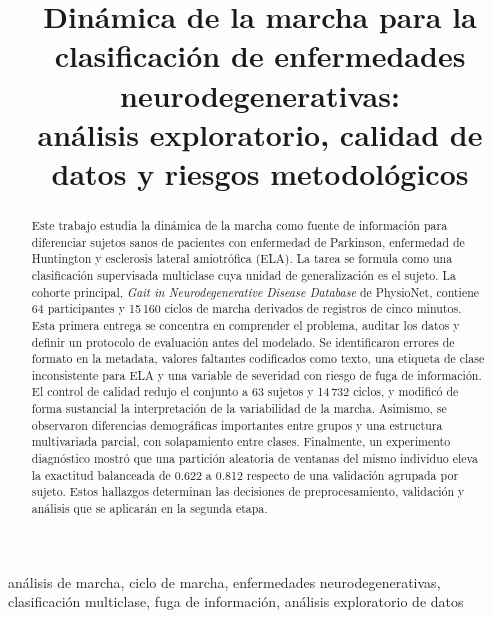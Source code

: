 \documentclass[conference]{IEEEtran}
\begin{document}
\title{Dinámica de la marcha para la clasificación de enfermedades neurodegenerativas:\\análisis exploratorio, calidad de datos y riesgos metodológicos}

\author{
}

\maketitle

\begin{abstract}
Este trabajo estudia la dinámica de la marcha como fuente de información para diferenciar sujetos sanos de pacientes con enfermedad de Parkinson, enfermedad de Huntington y esclerosis lateral amiotrófica (ELA). La tarea se formula como una clasificación supervisada multiclase cuya unidad de generalización es el sujeto. La cohorte principal, \textit{Gait in Neurodegenerative Disease Database} de PhysioNet, contiene 64 participantes y 15\,160 ciclos de marcha derivados de registros de cinco minutos. Esta primera entrega se concentra en comprender el problema, auditar los datos y definir un protocolo de evaluación antes del modelado. Se identificaron errores de formato en la metadata, valores faltantes codificados como texto, una etiqueta de clase inconsistente para ELA y una variable de severidad con riesgo de fuga de información. El control de calidad redujo el conjunto a 63 sujetos y 14\,732 ciclos, y modificó de forma sustancial la interpretación de la variabilidad de la marcha. Asimismo, se observaron diferencias demográficas importantes entre grupos y una estructura multivariada parcial, con solapamiento entre clases. Finalmente, un experimento diagnóstico mostró que una partición aleatoria de ventanas del mismo individuo eleva la exactitud balanceada de 0.622 a 0.812 respecto de una validación agrupada por sujeto. Estos hallazgos determinan las decisiones de preprocesamiento, validación y análisis que se aplicarán en la segunda etapa.
\end{abstract}

\begin{IEEEkeywords}
análisis de marcha, ciclo de marcha, enfermedades neurodegenerativas, clasificación multiclase, fuga de información, análisis exploratorio de datos
\end{IEEEkeywords}
\end{document}
